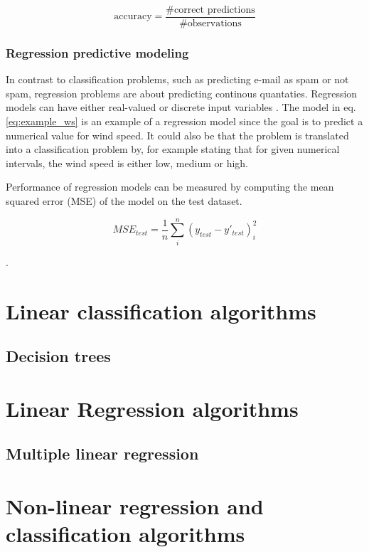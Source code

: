 \begin{equation}
	\mbox{accuracy} = \frac{\mbox{\#correct predictions}}{\mbox{\#observations}}
\end{equation}
	
\subsubsection{Regression predictive modeling}
	In contrast to classification problems, such as predicting e-mail as spam or not spam, regression problems are about predicting continous quantaties. Regression models can have either real-valued or discrete input variables \cite{WEBSITE:8}. The model in eq. \ref{eq:example_ws} is an example of a regression model since the goal is to predict a numerical value for wind speed. It could also be that the problem is translated into a classification problem by, for example stating that for given numerical intervals, the wind speed is either low, medium or high.

Performance of regression models can be measured by computing the mean squared error (MSE) of the model on the test dataset. 

\begin{equation}
	MSE_{test} = \frac{1}{n} \sum_{i}^{n}(y_{test} - y'_{test})_{i}^2
\end{equation}

 \cite{BOOK:1}. 


\section{Linear classification algorithms}
\subsection{Decision trees}

\section{Linear Regression algorithms}
\subsection{Multiple linear regression} \label{sec:mul-lin-reg}

\section{Non-linear regression and classification algorithms}
